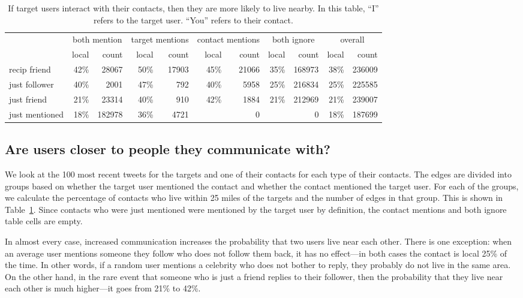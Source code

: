 \documentclass[letterpaper]{article}
\begin{document}
\begin{table}[tbh]
\scriptsize
\centering
\begin{tabular}{l | r r | r r | r r | r r | r r}
    & \multicolumn{2}{c}{both mention}
    & \multicolumn{2}{|c}{target mentions}
    & \multicolumn{2}{|c}{contact mentions}
    & \multicolumn{2}{|c}{both ignore}
    & \multicolumn{2}{|c}{overall} \\
    \cline{2-11}
    &local&count&local&count&local&count&local&count&local&count \\
    \hline
    recip friend & 42\%&28067 & 50\%&17903 & 45\%&21066 & 35\%&168973 & 38\%&236009 \\
    just follower & 40\%&2001 & 47\%&792 & 40\%&5958 & 25\%&216834 & 25\%&225585 \\
    just friend & 21\%&23314 & 40\%&910 & 42\%&1884 & 21\%&212969 & 21\%&239007 \\
    just mentioned & 18\%&182978 & 36\%&4721 & & 0 & & 0 & 18\%&187699 \\
\end{tabular}
\caption{
If target users interact with their contacts, then they are more likely to
live nearby.
%
In this table, ``I'' refers to the target user. ``You'' refers to their
contact.
%
}
\label{tab:ComTypes}
\end{table}

\subsection{Are users closer to people they communicate with?}

We look at the 100 most recent tweets for the targets and one of their
contacts for each type of their contacts.
%
The edges are divided into groups based on whether the target user
mentioned the contact and whether the contact mentioned the target user.
%
For each of the groups, we calculate the percentage of contacts who
live within 25 miles of the targets and the number of edges in that group.
%
This is shown in Table~\ref{tab:ComTypes}.
%
Since contacts who were just mentioned were mentioned by the target
user by definition, the contact mentions and both ignore table cells are
empty.

In almost every case, increased communication increases the probability that
two users live near each other.
%
There is one exception: when an average user mentions someone they follow who
does not follow them back, it has no effect---in both cases the contact is
local 25\% of the time.
%
In other words, if a random user mentions a celebrity who does not bother to
reply, they probably do not live in the same area.
%
On the other hand, in the rare event that someone who is just a friend replies
to their follower, then the probability that they live near each other is much
higher---it goes from 21\% to 42\%.
\end{document}
